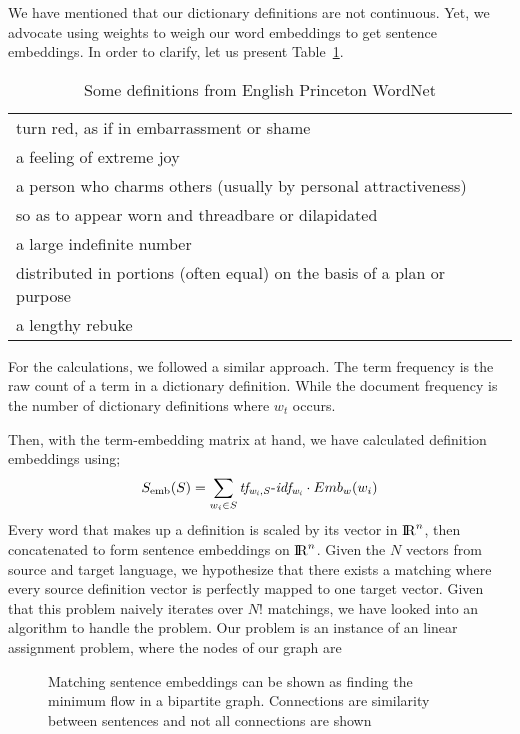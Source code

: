We have mentioned that our dictionary definitions are not continuous.
Yet, we advocate using \tfidf{} weights to weigh our word embeddings to get sentence embeddings.
In order to clarify, let us present Table~\ref{tab:en_it_examples}.

\begin{table}
    \centering
    \caption{Some definitions from English Princeton WordNet}%
    \label{tab:en_it_examples}
    \begin{tabular}{l}
        \toprule
        turn red, as if in embarrassment or shame \\
        a feeling of extreme joy \\
        a person who charms others (usually by personal attractiveness) \\
        so as to appear worn and threadbare or dilapidated \\
        a large indefinite number \\
        distributed in portions (often equal) on the basis of a plan or purpose \\
        a lengthy rebuke \\
        \bottomrule
    \end{tabular}
\end{table}

For the \tfidf{} calculations, we followed a similar approach.
The term frequency is the raw count of a term in a dictionary definition.
While the document frequency is the number of dictionary definitions where $w_t$ occurs.

Then, with the term-embedding matrix at hand, we have calculated definition embeddings using;
\begin{equation}
    S_{\text{emb}}(S) = \sum_{w_{i} \in S} {\operatorname{\mathit{tf_{w_{i},S}-idf_{w_i}}}} \cdot Emb_{w}(w_{i})
\end{equation}
Every word that makes up a definition is scaled by its vector in ${\rm I\!R}^n$, then concatenated to form sentence embeddings on ${\rm I\!R}^n$.
Given the $N$ vectors from source and target language, we hypothesize that there exists a matching where every source definition vector is perfectly mapped to one target vector.
Given that this problem naively iterates over $N!$ matchings, we have looked into an algorithm to handle the problem.
Our problem is an instance of an linear assignment problem, where the nodes of our graph are

\begin{figure}[htbp]
    \centering
    \caption{Matching sentence embeddings can be shown as finding the minimum flow in a bipartite graph. Connections are similarity between sentences and not all connections are shown}%
    \label{fig:bipartite_graph}
\end{figure}

